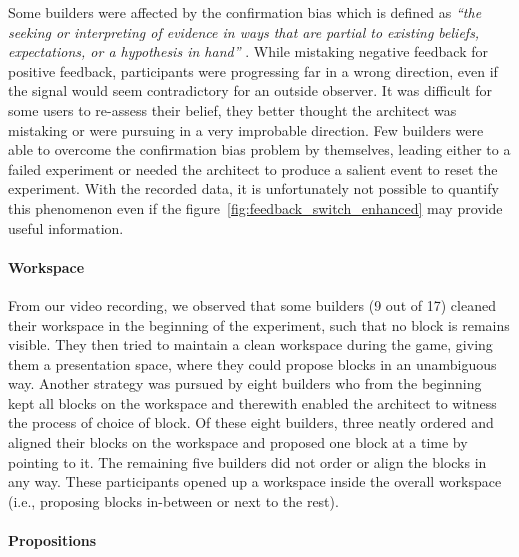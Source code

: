 Some builders were affected by the confirmation bias which is defined as \textit{``the seeking or interpreting of evidence in ways that are partial to existing beliefs, expectations, or a hypothesis in hand''} \cite{nickerson1998confirmation}. While mistaking negative feedback for positive feedback, participants were progressing far in a wrong direction, even if the signal would seem contradictory for an outside observer. It was difficult for some users to re-assess their belief, they better thought the architect was mistaking or were pursuing in a very improbable direction. Few builders were able to overcome the confirmation bias problem by themselves, leading either to a failed experiment or needed the architect to produce a salient event to reset the experiment. With the recorded data, it is unfortunately not possible to quantify this phenomenon even if the figure~\ref{fig:feedback_switch_enhanced} may provide useful information.

\paragraph{Workspace} 

From our video recording, we observed that some builders (9 out of 17) cleaned their workspace in the beginning of the experiment, such that no block is remains visible. They then tried to maintain a clean workspace during the game, giving them a presentation space, where they could propose blocks in an unambiguous way. Another strategy was pursued by eight builders who from the beginning kept all blocks on the workspace and therewith enabled the architect to witness the process of choice of block. Of these eight builders, three neatly ordered and aligned their blocks on the workspace and proposed one block at a time by pointing to it. The remaining five builders did not order or align the blocks in any way. These participants opened up a workspace inside the overall workspace (i.e., proposing blocks in-between or next to the rest).


\paragraph{Propositions} 

